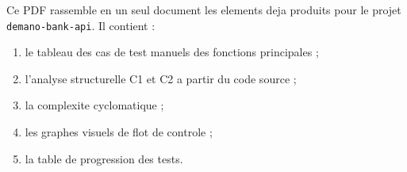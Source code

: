 \documentclass[12pt,a4paper]{article}
\begin{document}
Ce PDF rassemble en un seul document les elements deja produits pour le projet \texttt{demano-bank-api}. Il contient :

\begin{enumerate}[leftmargin=1.2cm]
\item le tableau des cas de test manuels des fonctions principales ;
\item l'analyse structurelle C1 et C2 a partir du code source ;
\item la complexite cyclomatique ;
\item les graphes visuels de flot de controle ;
\item la table de progression des tests.
\end{enumerate}

\newpage



\end{document}

